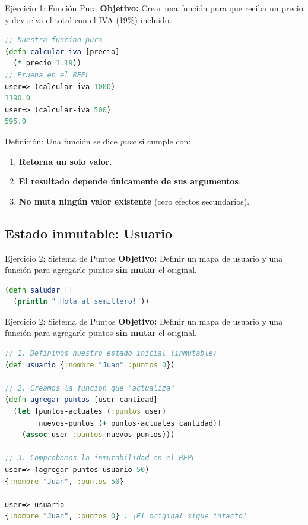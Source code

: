 \documentclass{beamer}
\begin{document}
\begin{frame}[fragile]{Ejercicio 1: Función Pura}
    \textbf{Objetivo:} Crear una función pura que reciba un precio y devuelva el total con el IVA (19\%) incluido.

    \begin{lstlisting}[language=Clojure]
;; Nuestra funcion pura
(defn calcular-iva [precio]
  (* precio 1.19))
;; Prueba en el REPL
user=> (calcular-iva 1000)
1190.0
user=> (calcular-iva 500)
595.0
    \end{lstlisting}
    
    \begin{block}{Definición:}
        Una función se dice \textit{pura} si cumple con:
    \begin{enumerate}
        \item \textbf{Retorna un solo valor}.
        \item \textbf{El resultado depende únicamente de sus argumentos}.
        \item \textbf{No muta ningún valor existente} (cero efectos secundarios).
    \end{enumerate}
    
    \end{block}
\end{frame}

\subsection{Estado inmutable: Usuario}

\begin{frame}[fragile]{Ejercicio 2: Sistema de Puntos}
    \textbf{Objetivo:} Definir un mapa de usuario y una función para agregarle puntos \textbf{sin mutar} el original.

            \begin{lstlisting}[language=Clojure]
(defn saludar []
  (println "¡Hola al semillero!"))
    \end{lstlisting}    
    
\end{frame}

\begin{frame}[fragile]{Ejercicio 2: Sistema de Puntos}
    \textbf{Objetivo:} Definir un mapa de usuario y una función para agregarle puntos \textbf{sin mutar} el original.

    \begin{lstlisting}[language=Clojure]
;; 1. Definimos nuestro estado inicial (inmutable)
(def usuario {:nombre "Juan" :puntos 0})

;; 2. Creamos la funcion que "actualiza"
(defn agregar-puntos [user cantidad]
  (let [puntos-actuales (:puntos user)
        nuevos-puntos (+ puntos-actuales cantidad)]
    (assoc user :puntos nuevos-puntos)))

;; 3. Comprobamos la inmutabilidad en el REPL
user=> (agregar-puntos usuario 50)
{:nombre "Juan", :puntos 50}

user=> usuario
{:nombre "Juan", :puntos 0} ; ¡El original sigue intacto!
    \end{lstlisting}
\end{frame}
\end{document}
